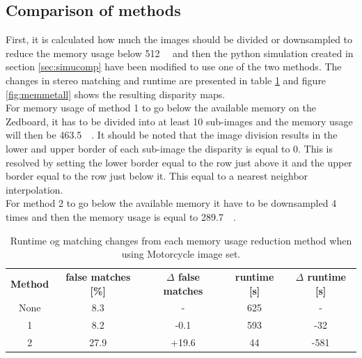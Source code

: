 \subsection*{Comparison of methods}
First, it is calculated how much the images should be divided or downsampled to reduce the memory usage below \SI{512}{\mega\byte} and then the python simulation created in section \ref{sec:simucomp} have been modified to use one of the two methods. The changes in stereo matching and runtime are presented in table \ref{tab:memmethodtable} and figure \ref{fig:memmetall} shows the resulting disparity maps.\\
For memory usage of method 1 to go below the available memory on the Zedboard, it has to be divided into at least 10 sub-images and the memory usage will then be \SI{463.5}{\mega\byte}. It should be noted that the image division results in the lower and upper border of each sub-image the disparity is equal to 0. This is resolved by setting the lower border equal to the row just above it and the upper border equal to the row just below it. This equal to a nearest neighbor interpolation.\\
For method 2 to go below the available memory it have to be downsampled 4 times and then the memory usage is equal to \SI{289.7}{\mega\byte}.\\

\begin{table}[!ht]
  \centering
  \begin{tabular}{c c c c c}
    \textbf{Method} &\textbf{ false matches [\%]} & \textbf{$\Delta$ false matches} & \textbf{runtime [s]} &  \textbf{$\Delta$ runtime [s]} \\
    None & 8.3 & - & 625 & - \\
    1 & 8.2 & -0.1 & 593 & -32  \\
    2 & 27.9 & +19.6 & 44 & -581 \\
  \end{tabular}
  \caption{Runtime og matching changes from each memory usage reduction method when using Motorcycle image set. \label{tab:memmethodtable}}
\end{table}

